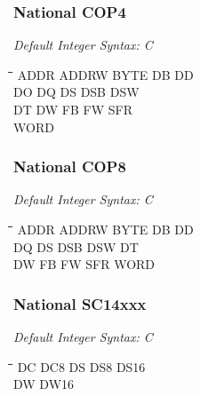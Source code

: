 \subsubsection{National COP4}

{\em Default Integer Syntax: C}

{\tt\begin{tabbing}
\hspace{3cm}\=\hspace{3cm}\=\hspace{3cm}\=\hspace{3cm}\=\kill
ADDR       \> ADDRW       \> BYTE        \> DB          \> DD \\
DO         \> DQ          \> DS          \> DSB         \> DSW \\
DT         \> DW          \> FB          \> FW          \> SFR \\
WORD \\
\end{tabbing}}

\subsubsection{National COP8}

{\em Default Integer Syntax: C}

{\tt\begin{tabbing}
\hspace{3cm}\=\hspace{3cm}\=\hspace{3cm}\=\hspace{3cm}\=\kill
ADDR       \> ADDRW       \> BYTE        \> DB          \> DD \\
DQ         \> DS          \> DSB         \> DSW         \> DT \\
DW         \> FB          \> FW          \> SFR         \> WORD \\
\end{tabbing}}

\subsubsection{National SC14xxx}

{\em Default Integer Syntax: C}

{\tt\begin{tabbing}
\hspace{3cm}\=\hspace{3cm}\=\hspace{3cm}\=\hspace{3cm}\=\kill
DC         \> DC8         \> DS          \> DS8         \> DS16 \\
DW         \> DW16 \\
\end{tabbing}}

